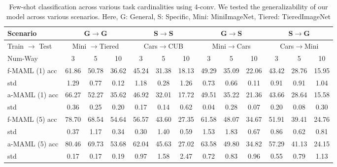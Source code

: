 \documentclass[letterpaper]{article} %
\begin{document}
\begin{table}[]
\centering
\begin{tabular}{l|ccc|ccc|ccc|ccc}
\toprule
Scenario & \multicolumn{3}{c|}{G$\rightarrow{}$G} & \multicolumn{3}{c|}{S$\rightarrow{}$S} & \multicolumn{3}{c|}{G$\rightarrow{}$S} & \multicolumn{3}{c}{S$\rightarrow{}$G} \\ 
\midrule
Train $\rightarrow{}$ Test & \multicolumn{3}{c|}{Mini $\rightarrow{}$Tiered} & \multicolumn{3}{c|}{Cars$\rightarrow{}$CUB} & \multicolumn{3}{c|}{Mini$\rightarrow{}$Cars} & \multicolumn{3}{c}{Cars$\rightarrow{}$Mini} \\ 
\midrule
Num-Way                   & 3 & 5 & 10 & 3 & 5 & 10 & 3 & 5 & 10 & 3 & 5 & 10 \\ 
\midrule
f-MAML (1) acc  & 61.86 & 50.78 & 36.62 & 45.24 & 31.38 & 18.13 & 49.29 & 35.09 & 22.06 & 43.42 & 28.76 & 15.95 \\
\hfill std  & 1.29 & 0.77 & 0.12 & 1.18 & 0.28 & 1.26 & 0.73 & 0.66 & 0.11 & 0.91 & 0.91 & 1.04 \\
\midrule
a-MAML (1) acc  & 66.27 & 52.27 & 35.62 & 46.92 & 32.01 & 17.72 & 49.51 & 35.22 & 21.36 & 43.66 & 28.64 & 15.58 \\
\hfill std  & 0.36 & 0.25 & 0.20 & 0.17 & 0.14 & 0.62 & 0.04 & 0.28 & 0.07 & 0.20 & 0.08 & 0.30 \\
\midrule
f-MAML (5) acc  & 78.70 & 68.54 & 54.64 & 56.57 & 43.60 & 27.35 & 61.58 & 48.07 & 34.67 & 51.91 & 39.41 & 24.76 \\
\hfill std  & 0.37 & 1.17 & 0.34 & 0.30 & 1.40 & 0.59 & 1.53 & 1.83 & 0.67 & 0.86 & 0.62 & 0.81 \\
\midrule
a-MAML (5) acc  & 80.46 & 69.73 & 53.68 & 62.04 & 45.63 & 27.02 & 63.58 & 49.80 & 34.82 & 57.29 & 41.13 & 24.15 \\
\hfill std  & 0.17 & 0.17 & 0.19 & 0.97 & 1.58 & 2.47 & 0.72 & 0.83 & 0.96 & 0.55 & 0.79 & 1.13 \\
\bottomrule
\end{tabular}
\caption{Few-shot classification across various task cardinalities using 4-conv. We tested the generalizability of our model across various scenarios. Here, G: General, S: Specific, Mini: MiniImageNet, Tiered: TieredImageNet}
\label{table:GBML_CROSS}
\end{table}
\end{document}

